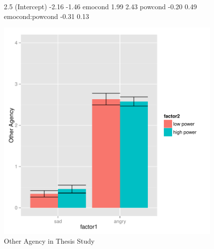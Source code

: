 \documentclass[man,apacite,floatsintext]{apa6}
\begin{document}
\begin{figure}
\begin{Schunk}
\begin{Soutput}
                2.5 %
(Intercept)     -2.16  -1.46
emocond          1.99   2.43
powcond         -0.20   0.49
emocond:powcond -0.31   0.13
\end{Soutput}
\end{Schunk}
\includegraphics{PowerResults-ThesisOthCont}
\caption{Other Agency in Thesis Study}
\end{figure}
\newpage
\end{document}
